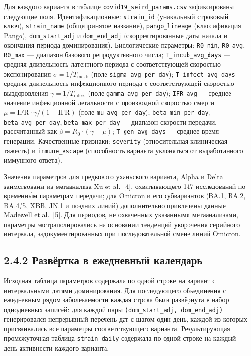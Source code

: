 \documentclass[12pt]{article}
\begin{document}
Для каждого варианта в таблице \texttt{covid19\_seird\_params.csv}
зафиксированы следующие поля. Идентификационные: \texttt{strain\_id}
(уникальный строковый ключ), \texttt{strain\_name} (общепринятое
название), \texttt{pango\_lineage} (классификация Pango),
\texttt{dom\_start\_adj} и \texttt{dom\_end\_adj} (скорректированные
даты начала и окончания периода доминирования). Биологические параметры:
\texttt{R0\_min}, \texttt{R0\_avg}, \texttt{R0\_max} --- диапазон
базового репродуктивного числа; \texttt{T\_incub\_avg\_days} --- средняя
длительность латентного периода с соответствующей скоростью
экспонирования \(\sigma = 1/T_{\text{incub}}\) (поле
\texttt{sigma\_avg\_per\_day}); \texttt{T\_infect\_avg\_days} ---
средняя длительность инфекционного периода с соответствующей скоростью
выздоровления \(\gamma = 1/T_{\text{infect}}\) (поле
\texttt{gamma\_avg\_per\_day}); \texttt{IFR\_avg} --- среднее значение
инфекционной летальности с производной скоростью смерти
\(\mu = \text{IFR} \cdot \gamma / (1 - \text{IFR})\) (поле
\texttt{mu\_avg\_per\_day}); \texttt{beta\_min\_per\_day},
\texttt{beta\_avg\_per\_day}, \texttt{beta\_max\_per\_day} --- диапазон
скорости передачи, рассчитанный как
\(\beta = R_0 \cdot (\gamma + \mu)\); \texttt{T\_gen\_avg\_days} ---
среднее время генерации. Качественные признаки: \texttt{severity}
(относительная клиническая тяжесть) и \texttt{immune\_escape}
(способность варианта уклоняться от выработанного иммунного ответа).

Значения параметров для предкового уханьского варианта, Alpha и Delta
заимствованы из метаанализа Xu et al.~{[}4{]}, охватывающего 147
исследований по временны́м параметрам передачи; для Omicron и его
субвариантов (BA.1, BA.2, BA.4/5, XBB, JN.1 и поздних линий)
дополнительно привлечены данные Madewell et al.~{[}5{]}. Для периодов,
не охваченных указанными метаанализами, параметры экстраполировались на
основании тенденций укорочения серийного интервала, задокументированных
при последовательной смене линий Omicron.

\subsection{2.4.2 Развёртка в ежедневный
календарь}\label{ux440ux430ux437ux432ux451ux440ux442ux43aux430-ux432-ux435ux436ux435ux434ux43dux435ux432ux43dux44bux439-ux43aux430ux43bux435ux43dux434ux430ux440ux44c}

Исходная таблица параметров содержала по одной строке на вариант с
интервальными датами доминирования. Для последующего объединения с
ежедневным рядом заболеваемости каждая строка была развёрнута в набор
однодневных записей: для каждой пары
\texttt{(dom\_start\_adj,\ dom\_end\_adj)} генерировался непрерывный
перечень дат с шагом один день, каждой из которых присваивались все
параметры соответствующего варианта. Результирующая промежуточная
таблица \texttt{strain\_daily} содержала по одной строке на каждый день
активности каждого варианта.
\end{document}
